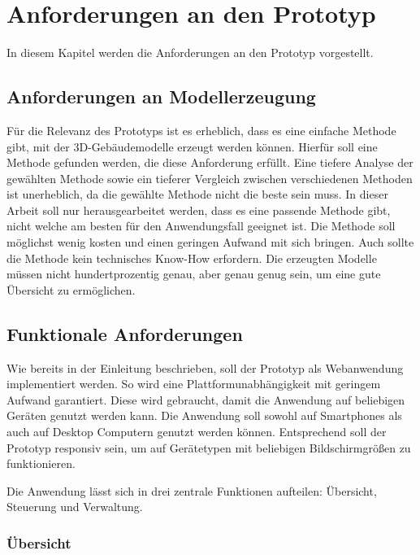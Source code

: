 \newpage
\section{Anforderungen an den Prototyp}
In diesem Kapitel werden die Anforderungen an den Prototyp vorgestellt.

\subsection{Anforderungen an Modellerzeugung}

Für die Relevanz des Prototyps ist es erheblich, dass es eine einfache Methode gibt, mit der 3D-Gebäudemodelle erzeugt werden können. Hierfür soll eine Methode gefunden werden, die diese Anforderung erfüllt. Eine tiefere Analyse der gewählten Methode sowie ein tieferer Vergleich zwischen verschiedenen Methoden ist unerheblich, da die gewählte Methode nicht die beste sein muss. In dieser Arbeit soll nur herausgearbeitet werden, dass es eine passende Methode gibt, nicht welche am besten für den Anwendungsfall geeignet ist. Die Methode soll möglichst wenig kosten und einen geringen Aufwand mit sich bringen. Auch sollte die Methode kein technisches Know-How erfordern. Die erzeugten Modelle müssen nicht hundertprozentig genau, aber genau genug sein, um eine gute Übersicht zu ermöglichen.

\subsection{Funktionale Anforderungen}\label{sec:FunctionalRequirements}
Wie bereits in der Einleitung beschrieben, soll der Prototyp als Webanwendung implementiert werden. So wird eine Plattformunabhängigkeit mit geringem Aufwand garantiert. Diese wird gebraucht, damit die Anwendung auf beliebigen Geräten genutzt werden kann. Die Anwendung soll sowohl auf Smartphones als auch auf Desktop Computern genutzt werden können. Entsprechend soll der Prototyp responsiv sein, um auf Gerätetypen mit beliebigen Bildschirmgrößen zu funktionieren.

Die Anwendung lässt sich in drei zentrale Funktionen aufteilen: Übersicht, Steuerung und Verwaltung.

\subsubsection{Übersicht}

